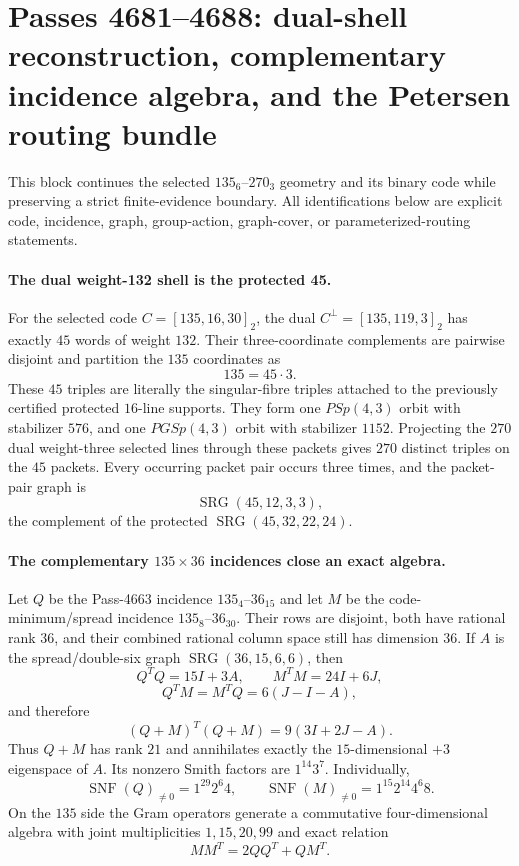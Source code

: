 \section*{Passes 4681--4688: dual-shell reconstruction, complementary incidence algebra, and the Petersen routing bundle}

This block continues the selected $135_6$--$270_3$ geometry and its binary code while preserving a strict finite-evidence boundary.  All identifications below are explicit code, incidence, graph, group-action, graph-cover, or parameterized-routing statements.

\paragraph{The dual weight-132 shell is the protected 45.}
For the selected code $C=[135,16,30]_2$, the dual $C^\perp=[135,119,3]_2$ has exactly $45$ words of weight $132$.  Their three-coordinate complements are pairwise disjoint and partition the $135$ coordinates as
\[
135=45\cdot3.
\]
These $45$ triples are literally the singular-fibre triples attached to the previously certified protected $16$-line supports.  They form one $PSp(4,3)$ orbit with stabilizer $576$, and one $PGSp(4,3)$ orbit with stabilizer $1152$.  Projecting the $270$ dual weight-three selected lines through these packets gives $270$ distinct triples on the $45$ packets.  Every occurring packet pair occurs three times, and the packet-pair graph is
\[
\operatorname{SRG}(45,12,3,3),
\]
the complement of the protected $\operatorname{SRG}(45,32,22,24)$.

\paragraph{The complementary $135\times36$ incidences close an exact algebra.}
Let $Q$ be the Pass-4663 incidence $135_4$--$36_{15}$ and let $M$ be the code-minimum/spread incidence $135_8$--$36_{30}$.  Their rows are disjoint, both have rational rank $36$, and their combined rational column space still has dimension $36$.  If $A$ is the spread/double-six graph $\operatorname{SRG}(36,15,6,6)$, then
\[
Q^{T}Q=15I+3A,\qquad M^{T}M=24I+6J,
\]
\[
Q^{T}M=M^{T}Q=6(J-I-A),
\]
and therefore
\[
(Q+M)^T(Q+M)=9(3I+2J-A).
\]
Thus $Q+M$ has rank $21$ and annihilates exactly the $15$-dimensional $+3$ eigenspace of $A$.  Its nonzero Smith factors are $1^{14}3^7$.  Individually,
\[
\operatorname{SNF}(Q)_{\ne0}=1^{29}2^6 4,
\qquad
\operatorname{SNF}(M)_{\ne0}=1^{15}2^{14}4^6 8.
\]
On the $135$ side the Gram operators generate a commutative four-dimensional algebra with joint multiplicities $1,15,20,99$ and exact relation
\[
MM^T=2QQ^T+QM^T.
\]

